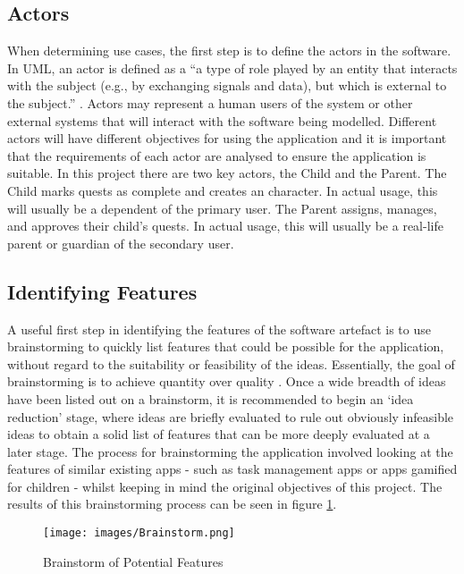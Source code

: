 \subsection{Actors}
When determining use cases, the first step is to define the actors in the software.
In UML, an actor is defined as a ``a type of role played by an entity that interacts with the subject (e.g., by exchanging signals and data), but which is external to the subject.'' \citep[p586-588]{omg2007unified}.
Actors may represent a human users of the system or other external systems that will interact with the software being modelled.
Different actors will have different objectives for using the application and it is important that the requirements of each actor are analysed to ensure the application is suitable. %
In this project there are two key actors, the Child and the Parent. 
The Child marks quests as complete and creates an character. In actual usage, this will usually be a dependent of the primary user. 
The Parent assigns, manages, and approves their child's quests. In actual usage, this will usually be a real-life parent or guardian of the secondary user.

\subsection{Identifying Features}
A useful first step in identifying the features of the software artefact is to use brainstorming to quickly list features that could be possible for the application, without regard to the suitability or feasibility of the ideas.
Essentially, the goal of brainstorming is to achieve quantity over quality \citep[p.144]{leffingwell2000managing}.
Once a wide breadth of ideas have been listed out on a brainstorm, it is recommended to begin an `idea reduction' stage, where ideas are briefly evaluated to rule out obviously infeasible ideas to obtain a solid list of features that can be more deeply evaluated at a later stage.
The process for brainstorming the application involved looking at the features of similar existing apps - such as task management apps or apps gamified for children - whilst keeping in mind the original objectives of this project.
The results of this brainstorming process can be seen in figure \ref{fig:brainstorm}.

\begin{figure}[ht]
	\centering
	\texttt{[image: images/Brainstorm.png]}
	\caption{Brainstorm of Potential Features}
	\label{fig:brainstorm}
\end{figure} 

